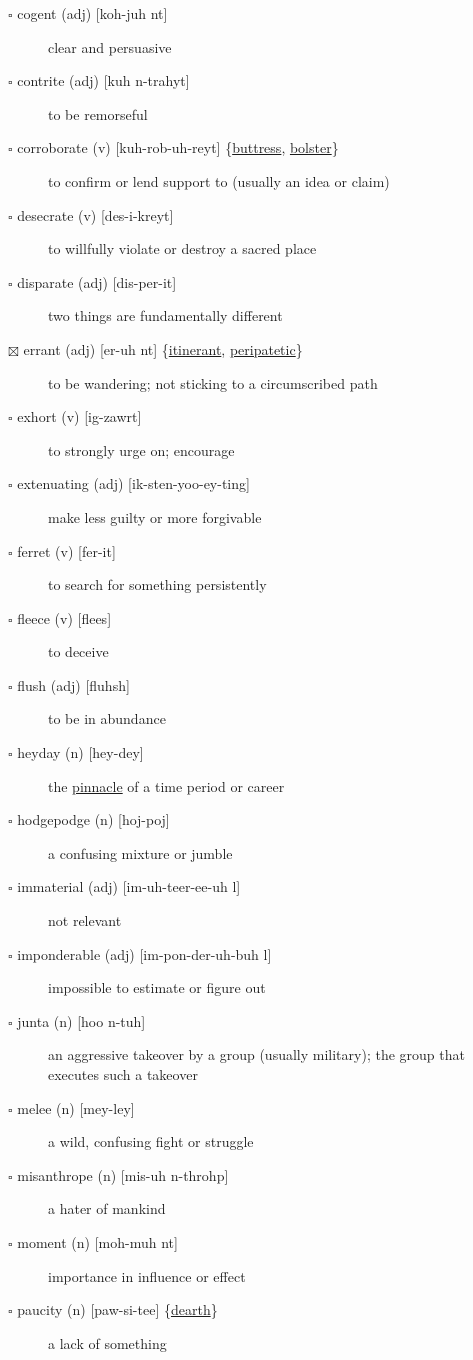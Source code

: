 \documentclass[11pt]{article}
\begin{document}
\begin{description}
\item[{$\square$ cogent (adj) [koh-juh nt]}] clear and persuasive
\item[{$\square$ \label{org9637a24} contrite (adj) [kuh n-trahyt]}] to be remorseful
\item[{$\square$ \label{orgf7ed622}corroborate (v) [kuh-rob-uh-reyt] \{\hyperref[org8c441c2]{buttress}, \hyperref[org28a9d71]{bolster}\}}] to confirm or lend support to (usually an idea or claim)
\item[{$\square$ desecrate (v) [des-i-kreyt]}] to willfully violate or destroy a sacred place
\item[{$\square$ disparate (adj) [dis-per-it]}] two things are fundamentally different
\item[{$\boxtimes$ \label{orgcb7fea8}errant (adj) [er-uh nt] \{\hyperref[orgab898fc]{itinerant}, \hyperref[org4d2fb07]{peripatetic}\}}] to be wandering; not sticking to a circumscribed path
\item[{$\square$ exhort (v) [ig-zawrt]}] to strongly urge on; encourage
\item[{$\square$ \label{org94911d6} extenuating (adj) [ik-sten-yoo-ey-ting]}] make less guilty or more forgivable
\item[{$\square$ ferret (v) [fer-it]}] to search for something persistently
\item[{$\square$ fleece (v) [flees]}] to deceive
\item[{$\square$ flush (adj) [fluhsh]}] to be in abundance
\item[{$\square$ heyday (n) [hey-dey]}] the \hyperref[orgc8167b5]{pinnacle} of a time period or career
\item[{$\square$ hodgepodge (n) [hoj-poj]}] a confusing mixture or jumble
\item[{$\square$ immaterial (adj) [im-uh-teer-ee-uh l]}] not relevant
\item[{$\square$ imponderable (adj) [im-pon-der-uh-buh l]}] impossible to estimate or figure out
\item[{$\square$ junta (n) [hoo n-tuh]}] an aggressive takeover by a group (usually military); the group that executes such a takeover
\item[{$\square$ melee (n) [mey-ley]}] a wild, confusing fight or struggle
\item[{$\square$ misanthrope (n) [mis-uh n-throhp]}] a hater of mankind
\item[{$\square$ moment (n) [moh-muh nt]}] importance in influence or effect
\item[{$\square$ \label{org77e3ca7}paucity (n) [paw-si-tee] \{\hyperref[org4805f17]{dearth}\}}] a lack of something

\end{description}
\end{document}
